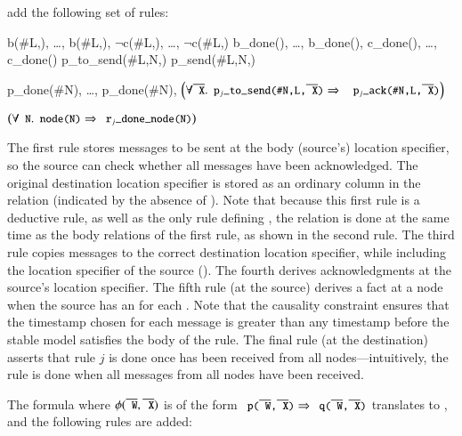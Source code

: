 add the following set of rules:

\begin{Drules}
      {b(#L,), \ldots, b(#L,), $\lnot$c(#L,), \ldots, $\lnot$c(#L,)}
      {b_done(), \ldots, b_done(), c_done(), \ldots, c_done()}
      {p_to_send(#L,N,)}
      {p_send(#L,N,)}

      {p_done(#N), \ldots, p_done(#N), \(\left(\forall \od{X} . \dedalus{p\sub{j}_to_send(#N,L,\od{X})} \Rightarrow \right.\) \(\left. \dedalus{p\sub{j}_ack(#N,L,\od{X})}\right)\)}

      {\(\left(\forall \dedalus{N} . \dedalus{node(N)} \Rightarrow \dedalus{r\sub{j}_done_node(N)}\right)\)}
\end{Drules}

The first rule stores messages to be sent at the body (source's) location
specifier, so the source can check whether all messages have
been acknowledged.  The original destination location specifier is stored as an
ordinary column in the  relation (indicated by the absence of \dedalus{#}).  Note that because this first rule is a deductive rule, as well as the only rule defining , the  relation is done at the same time as the body relations of the first rule, as shown in the second rule.  The third rule copies messages to the correct destination location specifier, while including the location specifier of the source ().  The fourth derives acknowledgments at the source's location specifier.  The fifth rule (at the source) derives a  fact at a node when the source has an  for each .  Note that the causality constraint ensures that the timestamp chosen for each  message is greater than any timestamp before the stable model satisfies the body of the rule.  The final rule (at the destination) asserts that rule $j$ is done once  has been received from all nodes---intuitively, the rule is done when all messages from all nodes have been received.

The formula  where $\phi(\od{W},\od{X})$ is of the form $\dedalus{p(\od{W},\od{X})} \Rightarrow \dedalus{q(\od{W},\od{X})}$ translates to , and the following rules are added:

